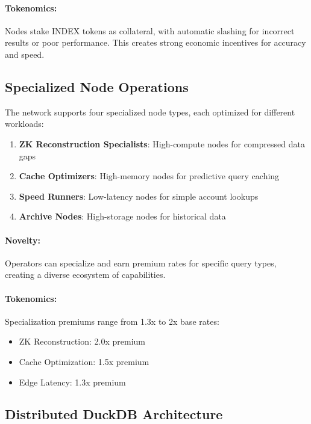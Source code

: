 \documentclass[12pt,a4paper]{article}
\begin{document}
\paragraph{Tokenomics:} Nodes stake INDEX tokens as collateral, with automatic slashing for incorrect results or poor performance. This creates strong economic incentives for accuracy and speed.

\subsection{Specialized Node Operations}

The network supports four specialized node types, each optimized for different workloads:

\begin{enumerate}
    \item \textbf{ZK Reconstruction Specialists}: High-compute nodes for compressed data gaps
    \item \textbf{Cache Optimizers}: High-memory nodes for predictive query caching
    \item \textbf{Speed Runners}: Low-latency nodes for simple account lookups
    \item \textbf{Archive Nodes}: High-storage nodes for historical data
\end{enumerate}

\paragraph{Novelty:} Operators can specialize and earn premium rates for specific query types, creating a diverse ecosystem of capabilities.

\paragraph{Tokenomics:} Specialization premiums range from 1.3x to 2x base rates:
\begin{itemize}
    \item ZK Reconstruction: 2.0x premium
    \item Cache Optimization: 1.5x premium
    \item Edge Latency: 1.3x premium
\end{itemize}

\subsection{Distributed DuckDB Architecture}
\end{document}
